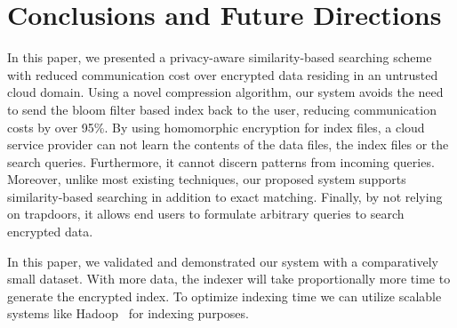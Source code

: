 

\section{Conclusions and Future Directions}
\label{sec:conclusion}

In this paper, we presented a privacy-aware similarity-based searching scheme
with reduced communication cost over encrypted data residing in an untrusted
cloud domain. Using a novel compression 
algorithm, our system avoids the need to send the bloom filter based index back to the 
user, reducing communication costs by over 95\%.
By using homomorphic encryption for index files, a cloud service provider can not 
learn the contents of 
the data files, the index files or the search queries. Furthermore, it cannot 
discern patterns from incoming queries. Moreover, unlike most existing techniques, our
proposed system supports similarity-based searching in addition to exact matching.
Finally, by not relying on trapdoors, it allows end users to formulate
arbitrary queries to search encrypted data.

In this paper, we validated and demonstrated our system with a comparatively 
small dataset. With more data, the indexer will take proportionally
more time to generate the
encrypted index. To optimize indexing time we can
utilize scalable systems like Hadoop~\cite{hadoop} for indexing
purposes.
